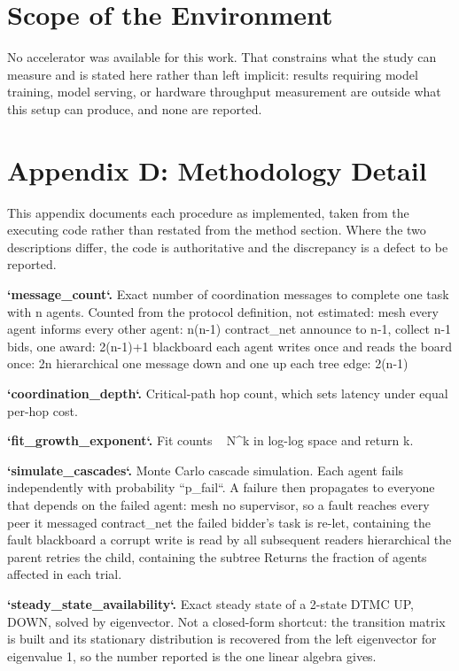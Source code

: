 \documentclass{article}
\begin{document}
\section{Scope of the Environment}


No accelerator was available for this work. That constrains what the study can measure and is stated here rather than left implicit: results requiring model training, model serving, or hardware throughput measurement are outside what this setup can produce, and none are reported.




\section{Appendix D: Methodology Detail}


This appendix documents each procedure as implemented, taken from the executing code rather than restated from the method section. Where the two descriptions differ, the code is authoritative and the discrepancy is a defect to be reported.

\textbf{`message\_count`.} Exact number of coordination messages to complete one task with n agents. Counted from the protocol definition, not estimated: mesh every agent informs every other agent: n(n-1) contract\_net announce to n-1, collect n-1 bids, one award: 2(n-1)+1 blackboard each agent writes once and reads the board once: 2n hierarchical one message down and one up each tree edge: 2(n-1)

\textbf{`coordination\_depth`.} Critical-path hop count, which sets latency under equal per-hop cost.

\textbf{`fit\_growth\_exponent`.} Fit counts ~ N^k in log-log space and return k.

\textbf{`simulate\_cascades`.} Monte Carlo cascade simulation. Each agent fails independently with probability ``p\_fail``. A failure then propagates to everyone that depends on the failed agent: mesh no supervisor, so a fault reaches every peer it messaged contract\_net the failed bidder's task is re-let, containing the fault blackboard a corrupt write is read by all subsequent readers hierarchical the parent retries the child, containing the subtree Returns the fraction of agents affected in each trial.

\textbf{`steady\_state\_availability`.} Exact steady state of a 2-state DTMC {UP, DOWN}, solved by eigenvector. Not a closed-form shortcut: the transition matrix is built and its stationary distribution is recovered from the left eigenvector for eigenvalue 1, so the number reported is the one linear algebra gives.
\end{document}
